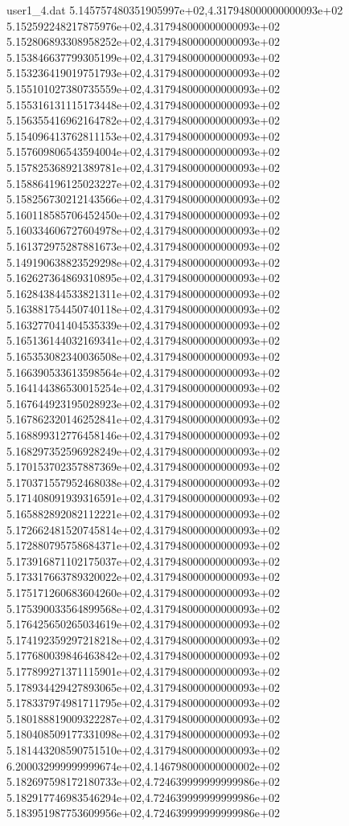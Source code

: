 \begin{filecontents}{user1_4.dat}
5.145757480351905997e+02,4.317948000000000093e+02
5.152592248217875976e+02,4.317948000000000093e+02
5.152806893308958252e+02,4.317948000000000093e+02
5.153846637799305199e+02,4.317948000000000093e+02
5.153236419019751793e+02,4.317948000000000093e+02
5.155101027380735559e+02,4.317948000000000093e+02
5.155316131115173448e+02,4.317948000000000093e+02
5.156355416962164782e+02,4.317948000000000093e+02
5.154096413762811153e+02,4.317948000000000093e+02
5.157609806543594004e+02,4.317948000000000093e+02
5.157825368921389781e+02,4.317948000000000093e+02
5.158864196125023227e+02,4.317948000000000093e+02
5.158256730212143566e+02,4.317948000000000093e+02
5.160118585706452450e+02,4.317948000000000093e+02
5.160334606727604978e+02,4.317948000000000093e+02
5.161372975287881673e+02,4.317948000000000093e+02
5.149190638823529298e+02,4.317948000000000093e+02
5.162627364869310895e+02,4.317948000000000093e+02
5.162843844533821311e+02,4.317948000000000093e+02
5.163881754450740118e+02,4.317948000000000093e+02
5.163277041404535339e+02,4.317948000000000093e+02
5.165136144032169341e+02,4.317948000000000093e+02
5.165353082340036508e+02,4.317948000000000093e+02
5.166390533613598564e+02,4.317948000000000093e+02
5.164144386530015254e+02,4.317948000000000093e+02
5.167644923195028923e+02,4.317948000000000093e+02
5.167862320146252841e+02,4.317948000000000093e+02
5.168899312776458146e+02,4.317948000000000093e+02
5.168297352596928249e+02,4.317948000000000093e+02
5.170153702357887369e+02,4.317948000000000093e+02
5.170371557952468038e+02,4.317948000000000093e+02
5.171408091939316591e+02,4.317948000000000093e+02
5.165882892082112221e+02,4.317948000000000093e+02
5.172662481520745814e+02,4.317948000000000093e+02
5.172880795758684371e+02,4.317948000000000093e+02
5.173916871102175037e+02,4.317948000000000093e+02
5.173317663789320022e+02,4.317948000000000093e+02
5.175171260683604260e+02,4.317948000000000093e+02
5.175390033564899568e+02,4.317948000000000093e+02
5.176425650265034619e+02,4.317948000000000093e+02
5.174192359297218218e+02,4.317948000000000093e+02
5.177680039846463842e+02,4.317948000000000093e+02
5.177899271371115901e+02,4.317948000000000093e+02
5.178934429427893065e+02,4.317948000000000093e+02
5.178337974981711795e+02,4.317948000000000093e+02
5.180188819009322287e+02,4.317948000000000093e+02
5.180408509177331098e+02,4.317948000000000093e+02
5.181443208590751510e+02,4.317948000000000093e+02
6.200032999999999674e+02,4.146798000000000002e+02
5.182697598172180733e+02,4.724639999999999986e+02
5.182917746983546294e+02,4.724639999999999986e+02
5.183951987753609956e+02,4.724639999999999986e+02

\end{filecontents}
